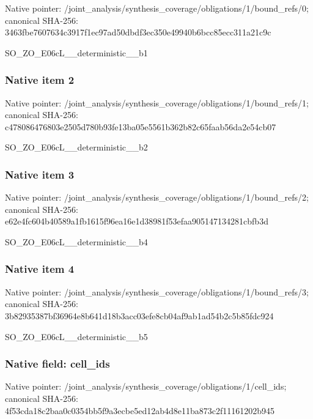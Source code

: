 \documentclass[10pt,a4paper]{article}
\begin{document}
Native pointer: /joint\_analysis/synthesi\allowbreak{}s\_coverage/obligations/1\allowbreak{}/bound\_refs/0; canonical SHA-256: 3463fbe7607634c3917f1ec9\allowbreak{}7ad50dbdf3ec350e49940b6b\allowbreak{}cc85ecc311a21c9c


SO\_ZO\_E06cL\_\_deterministic\_\_b1


\subsubsection{Native item 2}


Native pointer: /joint\_analysis/synthesi\allowbreak{}s\_coverage/obligations/1\allowbreak{}/bound\_refs/1; canonical SHA-256: c478086476803e2505d780b9\allowbreak{}3fe13ba05e5561b362b82c65\allowbreak{}faab56da2e54cb07


SO\_ZO\_E06cL\_\_deterministic\_\_b2


\subsubsection{Native item 3}


Native pointer: /joint\_analysis/synthesi\allowbreak{}s\_coverage/obligations/1\allowbreak{}/bound\_refs/2; canonical SHA-256: e62e4fc604b40589a1fb1615\allowbreak{}f96ea16e1d38981f53efaa90\allowbreak{}5147134281cbfb3d


SO\_ZO\_E06cL\_\_deterministic\_\_b4


\subsubsection{Native item 4}


Native pointer: /joint\_analysis/synthesi\allowbreak{}s\_coverage/obligations/1\allowbreak{}/bound\_refs/3; canonical SHA-256: 3b82935387bf36964e8b641d\allowbreak{}18b3acc03efe8cb04af9ab1a\allowbreak{}d54b2c5b85fdc924


SO\_ZO\_E06cL\_\_deterministic\_\_b5


\subsubsection{Native field: cell\_ids}


Native pointer: /joint\_analysis/synthesi\allowbreak{}s\_coverage/obligations/1\allowbreak{}/cell\_ids; canonical SHA-256: 4f53cda18c2baa0c0354bb5f\allowbreak{}9a3ecbe5ed12ab4d8e11ba87\allowbreak{}3c2f11161202b945
\end{document}
